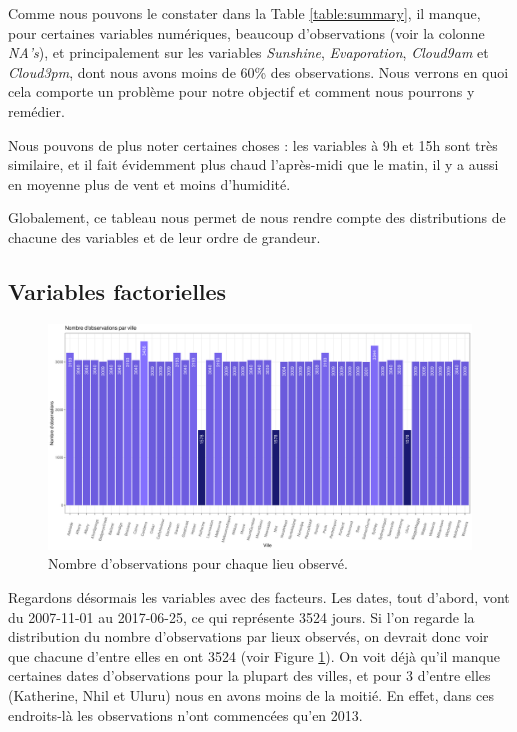 \documentclass{article}
\begin{document}
Comme nous pouvons le constater dans la Table \ref{table:summary}, il manque, pour certaines variables numériques, beaucoup d'observations (voir la colonne \emph{NA's}), et principalement sur les variables \emph{Sunshine}, \emph{Evaporation}, \emph{Cloud9am} et \emph{Cloud3pm}, dont nous avons moins de 60\% des observations. Nous verrons en quoi cela comporte un problème pour notre objectif et comment nous pourrons y remédier.

Nous pouvons de plus noter certaines choses : les variables à 9h et 15h sont très similaire, et il fait évidemment plus chaud l'après-midi que le matin, il y a aussi en moyenne plus de vent et moins d'humidité. 

Globalement, ce tableau nous permet de nous rendre compte des distributions de chacune des variables et de leur ordre de grandeur. 

\subsection{Variables factorielles}

\begin{figure}[htp]
    \centering
    \includegraphics[width=\textwidth]{Images/hist_observations_cities.pdf}
    \caption{Nombre d'observations pour chaque lieu observé.}
    \label{fig:obs_per_cities}
\end{figure}

Regardons désormais les variables avec des facteurs. Les dates, tout d'abord, vont du 2007-11-01 au 2017-06-25, ce qui représente 3524 jours. Si l'on regarde la distribution du nombre d'observations par lieux observés, on devrait donc voir que chacune d'entre elles en ont 3524 (voir Figure \ref{fig:obs_per_cities}). On voit déjà qu'il manque certaines dates d'observations pour la plupart des villes, et pour 3 d'entre elles (Katherine, Nhil et Uluru) nous en avons moins de la moitié. En effet, dans ces endroits-là les observations n'ont commencées qu'en 2013.
\end{document}
